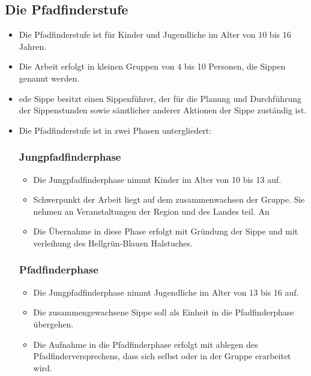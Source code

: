 \documentclass[a4paper]{article}
\begin{document}
    \subsection{Die Pfadfinderstufe} %
    \label{sub:die_pfadfinderstufe}
    \begin{itemize}
        \item Die Pfadfinderstufe ist für Kinder und Jugendliche im Alter von 10 bis 16 Jahren. 
        \item Die Arbeit erfolgt in kleinen Gruppen von 4 bis 10 Personen, die Sippen genannt werden.
        \item ede Sippe besitzt einen Sippenführer, der für die Planung und Durchführung der Sippenstunden sowie sämtlicher anderer Aktionen der Sippe zuständig ist. 
        \item Die Pfadfinderstufe ist in zwei Phasen untergliedert:
        \subsubsection{Jungpfadfinderphase} %
        \label{ssub:jungpfadfinderphase}
            \begin{itemize}
                \item Die Jungpfadfinderphase nimmt Kinder im Alter von 10 bis 13 auf.
                \item Schwerpunkt der Arbeit liegt auf dem zusammenwachsen der Gruppe. Sie nehmen an Veranstaltungen der Region und des Landes teil. An
                \item Die Übernahme in diese Phase erfolgt mit Gründung der Sippe und mit verleihung des Hellgrün-Blauen Halstuches.
            \end{itemize}
        \subsubsection{Pfadfinderphase} %
        \label{ssub:pfadfinderphase}
        \begin{itemize}
            \item Die Jungpfadfinderphase nimmt Jugendliche im Alter von 13 bis 16 auf.
            \item Die zusammengewachsene Sippe soll als Einheit in die Pfadfinderphase übergehen.
            \item Die Aufnahme in die Pfadfinderphase erfolgt mit ablegen des Pfadfinderversprechens, dass sich selbst oder in der Gruppe erarbeitet wird.
        \end{itemize}
    \end{itemize}
    
\end{document}
